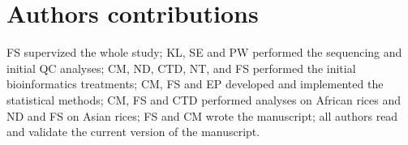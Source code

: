 \documentclass[10pt,letterpaper]{article}
\begin{document}
\section*{Authors contributions}
FS supervized the whole study; KL, SE and PW performed the sequencing and initial QC analyses; CM, ND, CTD, NT, and FS performed the initial bioinformatics treatments; CM, FS and EP developed and implemented the statistical methods; CM, FS and CTD performed analyses on African rices and ND and FS on Asian rices; FS and CM wrote the manuscript; all authors read and validate the current version of the manuscript.


\nolinenumbers

% 
% 
\end{document}

